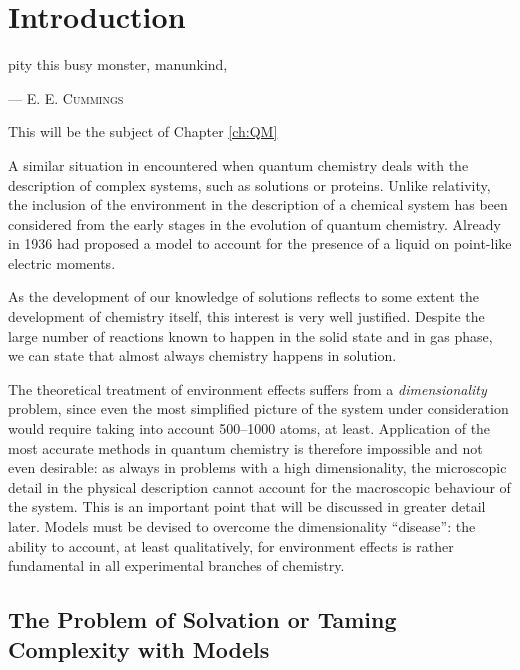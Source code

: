 \chapter*{Introduction}

\epigraph{
pity this busy monster, manunkind,
    }{
    --- \textsc{E. E. Cummings}}

This will be the subject of Chapter \ref{ch:QM}

A similar situation in encountered when quantum chemistry deals with the
description of complex systems, such as solutions or proteins. Unlike
relativity, the inclusion of the environment in the description of a
chemical system has been considered from the early stages in the
evolution of quantum chemistry.
Already in 1936 \citeauthor{Onsager1936-wf} had proposed a model to
account for the presence of a liquid on point-like electric
moments.~\autocite{Onsager1936-wf}

As the development of our knowledge of solutions reflects to some extent
the development of chemistry itself, this interest is very well
justified.
Despite the large number of reactions known to happen in the solid state
and in gas phase, we can state that almost always chemistry happens in
solution.~\autocite{Reichardt2010-le}

The theoretical treatment of environment effects suffers from a
\emph{dimensionality} problem, since even the most simplified picture of
the system under consideration would require taking into account
500--1000 atoms, at least. Application of the most accurate methods in
quantum chemistry is therefore impossible and not even desirable: as
always in problems with a high dimensionality, the microscopic detail in
the physical description cannot account for the macroscopic behaviour of
the system. This is an important point that will be discussed in greater
detail later.
Models must be devised to overcome the dimensionality ``disease'': the
ability to account, at least qualitatively, for environment effects is
rather fundamental in all experimental branches of
chemistry.~\autocite{Anderson1972-ai, Winsberg2010-sy, Kovac2011-ew}

\section*{The Problem of Solvation or Taming Complexity with Models}

